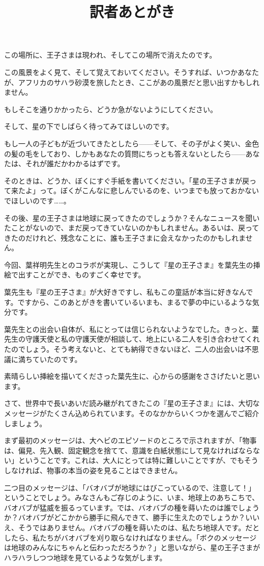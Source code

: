 この場所に、王子さまは現われ、そしてこの場所で消えたのです。

この風景をよく見て、そして覚えておいてください。そうすれば、いつかあなたが、アフリカのサハラ砂漠を旅したとき、ここがあの風景だと思い出すかもしれません。

もしそこを通りかかったら、どうか急がないようにしてください。

そして、星の下でしばらく待ってみてほしいのです。

もし一人の子どもが近づいてきたとしたら——そして、その子がよく笑い、金色の髪の毛をしており、しかもあなたの質問にちっとも答えないとしたら——あなたは、それが誰だかわかるはずです。

そのときは、どうか、ぼくにすぐ手紙を書いてください。「星の王子さまが戻って来たよ」って。ぼくがこんなに悲しんでいるのを、いつまでも放っておかないでほしいのです……。
\title{訳者あとがき}

その後、星の王子さまは地球に戻ってきたのでしょうか？そんなニュースを聞いたことがないので、まだ戻ってきていないのかもしれません。あるいは、戻ってきたのだけれど、残念なことに、誰も王子さまに会えなかったのかもしれません。

今回、葉祥明先生とのコラボが実現し、こうして『星の王子さま』を葉先生の挿絵で出すことができ、ものすごく幸せです。

葉先生も『星の王子さま』が大好きですし、私もこの童話が本当に好きなんです。ですから、このあとがきを書いているいまも、まるで夢の中にいるような気分です。

葉先生との出会い自体が、私にとっては信じられないようなでした。きっと、葉先生の守護天使と私の守護天使が相談して、地上にいる二人を引き合わせてくれたのでしょう。そう考えないと、とても納得できないほど、二人の出会いは不思議に満ちていたのです。

素晴らしい挿絵を描いてくださった葉先生に、心からの感謝をささげたいと思います。

さて、世界中で長いあいだ読み継がれてきたこの『星の王子さま』には、大切なメッセージがたくさん込められています。そのなかからいくつかを選んでご紹介しましょう。

まず最初のメッセージは、大ヘビのエピソードのところで示されますが、「物事は、偏見、先入観、固定観念を捨てて、意識を白紙状態にして見なければならない」ということです。これは、大人にとっては特に難しいことですが、でもそうしなければ、物事の本当の姿を見ることはできません。

二つ目のメッセージは、「バオバブが地球にはびこっているので、注意して！」ということでしょう。みなさんもご存じのように、いま、地球上のあちこちで、バオバブが猛威を振るっています。では、バオバブの種を蒔いたのは誰でしょうか？バオバブがどこかから勝手に飛んできて、勝手に生えたのでしょうか？いいえ、そうではありません。バオバブの種を蒔いたのは、私たち地球人です。だとしたら、私たちがバオバブを刈り取らなければなりません。「ボクのメッセージは地球のみんなにちゃんと伝わっただろうか？」と思いながら、星の王子さまがハラハラしつつ地球を見ているような気がします。

